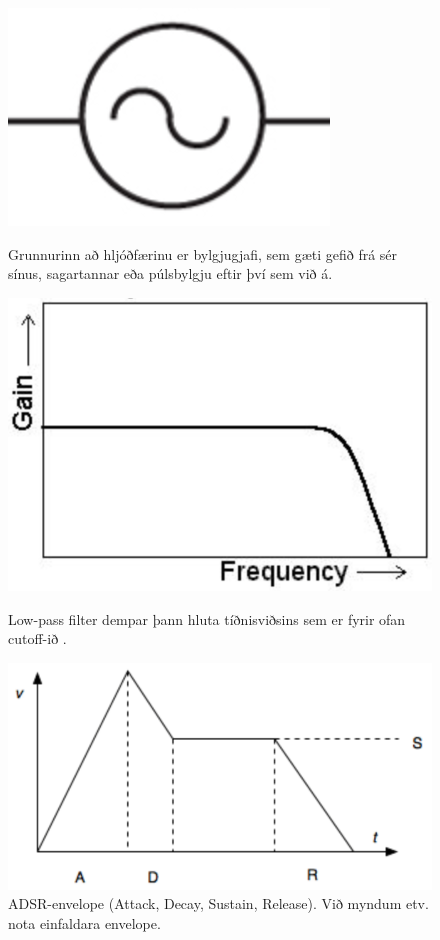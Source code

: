 \documentclass[a4paper,11pt,twocolumn]{article}
\begin{document}
\begin{figure}[!htb]
	\begin{center}
  \includegraphics[width=\linewidth]{osc.png}
  \caption[Bylgjugjafi]{Grunnurinn að hljóðfærinu er bylgjugjafi, sem gæti gefið frá sér sínus, sagartannar eða púlsbylgju eftir því sem við á.}
\endminipage\hfill
{}
  \includegraphics[width=\linewidth]{lpf.png}
  \caption[Low pass filter]{Low-pass filter dempar þann hluta tíðnisviðsins sem er fyrir ofan cutoff-ið .}
\endminipage\hfill
{}
  \includegraphics[width=\linewidth]{adsr.png}
  \caption[ADSR-envelope]{ADSR-envelope (Attack, Decay, Sustain, Release). Við myndum etv. nota einfaldara envelope.}
\endminipage
\end{center}
\end{figure}
\end{document}

